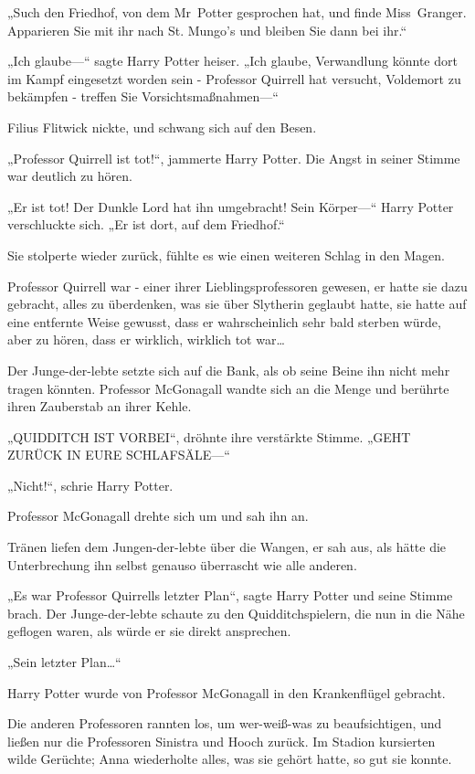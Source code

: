 {„Such den Friedhof, von dem Mr~Potter gesprochen hat, und finde Miss~Granger. Apparieren Sie mit ihr nach St. Mungo's und bleiben Sie dann bei ihr.“

„Ich glaube—“ sagte Harry Potter heiser. „Ich glaube, Verwandlung könnte dort im Kampf eingesetzt worden sein - Professor Quirrell hat versucht, Voldemort zu bekämpfen - treffen Sie Vorsichtsmaßnahmen—“

Filius Flitwick nickte, und schwang sich auf den Besen.

„Professor Quirrell ist tot!“, jammerte Harry Potter. Die Angst in seiner Stimme war deutlich zu hören.

„Er ist tot! Der Dunkle Lord hat ihn umgebracht! Sein Körper—“ Harry Potter verschluckte sich. „Er ist dort, auf dem Friedhof.“

Sie stolperte wieder zurück, fühlte es wie einen weiteren Schlag in den Magen.

Professor Quirrell war - einer ihrer Lieblingsprofessoren gewesen, er hatte sie dazu gebracht, alles zu überdenken, was sie über Slytherin geglaubt hatte, sie hatte auf eine entfernte Weise gewusst, dass er wahrscheinlich sehr bald sterben würde, aber zu hören, dass er wirklich, wirklich tot war…

Der Junge-der-lebte setzte sich auf die Bank, als ob seine Beine ihn nicht mehr tragen könnten. Professor McGonagall wandte sich an die Menge und berührte ihren Zauberstab an ihrer Kehle.

„QUIDDITCH IST VORBEI“, dröhnte ihre verstärkte Stimme. „GEHT ZURÜCK IN EURE SCHLAFSÄLE—“

„Nicht!“, schrie Harry Potter.

Professor McGonagall drehte sich um und sah ihn an.

Tränen liefen dem Jungen-der-lebte über die Wangen, er sah aus, als hätte die Unterbrechung ihn selbst genauso überrascht wie alle anderen.

„Es war Professor Quirrells letzter Plan“, sagte Harry Potter und seine Stimme brach. Der Junge-der-lebte schaute zu den Quidditchspielern, die nun in die Nähe geflogen waren, als würde er sie direkt ansprechen.

„Sein letzter Plan…“

Harry Potter wurde von Professor McGonagall in den Krankenflügel gebracht.

Die anderen Professoren rannten los, um wer-weiß-was zu beaufsichtigen, und ließen nur die Professoren Sinistra und Hooch zurück. Im Stadion kursierten wilde Gerüchte; Anna wiederholte alles, was sie gehört hatte, so gut sie konnte.

}
